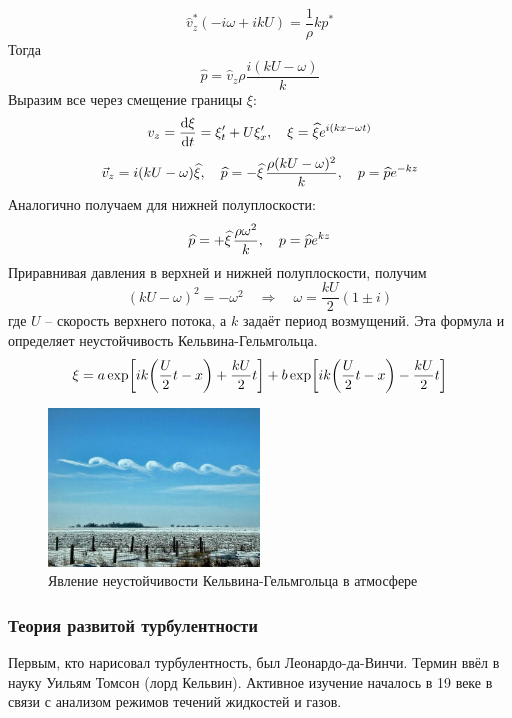\begin{equation}
    \hat{v}_z^* (-i\omega +ikU) = \frac{1}{\rho}k p^*
\end{equation} 
Тогда
\begin{equation}
    \hat{p} = \hat{v}_z \rho \frac{i(kU-\omega)}{k}
\end{equation}
Выразим все через смещение границы $\xi$:
\begin{equation}
    v_z = \dv{\xi}{t} = \xi'_t + U \xi'_x, \quad
    \xi = \widehat{\xi} e^{i(kx-\omega t)}
\end{equation}
\begin{equation}
    \vec{v}_z = i(kU-\omega)\hat{\xi}, \quad
    \hat{p} = -\phat{\xi} \frac{\rho(kU-\omega)^2}{k}, \quad
        p = \hat{p} e^{-kz}
\end{equation}
Аналогично получаем для нижней полуплоскости:
\begin{equation}
   \hat{p} = +\phat{\xi} \frac{\rho \omega^2}{k}, \quad
   p = \hat{p} e^{kz} 
\end{equation}
Приравнивая давления в верхней и нижней полуплоскости, получим
\begin{equation}
    (kU-\omega)^2 = -\omega^2 
    \quad\Rightarrow\quad 
    \omega = \frac{kU}{2}(1\pm i)
\end{equation}
где $U$ -- скорость верхнего потока, а $k$ задаёт период возмущений.
Эта формула и определяет неустойчивость Кельвина-Гельмгольца.
\begin{equation}
    \xi = a \exp[
        ik \qty(\frac{U}{2}t-x)+ \frac{kU}{2}t
    ]+b\exp[
        ik\qty(\frac{U}{2}t-x)-\frac{kU}{2}t
    ]
\end{equation}

\begin{figure}[H]
	\centering
	\includegraphics[width=0.5\textwidth]{img/xi_kelv.png}
	\caption{Явление неустойчивости Кельвина-Гельмгольца в атмосфере}
	\label{fig:xi_kelv}
\end{figure}

\subsubsection{Теория развитой турбулентности}
Первым, кто нарисовал турбулентность, был Леонардо-да-Винчи. Термин
ввёл в науку Уильям Томсон (лорд Кельвин). Активное изучение началось в 
19 веке в связи с анализом режимов течений жидкостей и газов.

